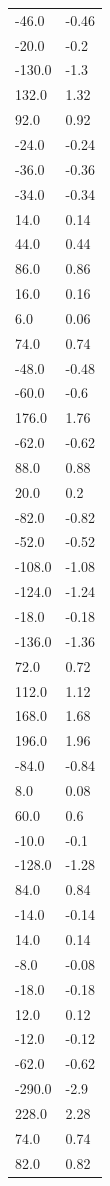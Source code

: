\begin{longtable}{ll}
-46.0 & -0.46 \\
-20.0 & -0.2 \\
-130.0 & -1.3 \\
132.0 & 1.32 \\
92.0 & 0.92 \\
-24.0 & -0.24 \\
-36.0 & -0.36 \\
-34.0 & -0.34 \\
14.0 & 0.14 \\
44.0 & 0.44 \\
86.0 & 0.86 \\
16.0 & 0.16 \\
6.0 & 0.06 \\
74.0 & 0.74 \\
-48.0 & -0.48 \\
-60.0 & -0.6 \\
176.0 & 1.76 \\
-62.0 & -0.62 \\
88.0 & 0.88 \\
20.0 & 0.2 \\
-82.0 & -0.82 \\
-52.0 & -0.52 \\
-108.0 & -1.08 \\
-124.0 & -1.24 \\
-18.0 & -0.18 \\
-136.0 & -1.36 \\
72.0 & 0.72 \\
112.0 & 1.12 \\
168.0 & 1.68 \\
196.0 & 1.96 \\
-84.0 & -0.84 \\
8.0 & 0.08 \\
60.0 & 0.6 \\
-10.0 & -0.1 \\
-128.0 & -1.28 \\
84.0 & 0.84 \\
-14.0 & -0.14 \\
14.0 & 0.14 \\
-8.0 & -0.08 \\
-18.0 & -0.18 \\
12.0 & 0.12 \\
-12.0 & -0.12 \\
-62.0 & -0.62 \\
-290.0 & -2.9 \\
228.0 & 2.28 \\
74.0 & 0.74 \\
82.0 & 0.82 \\

\end{longtable}
